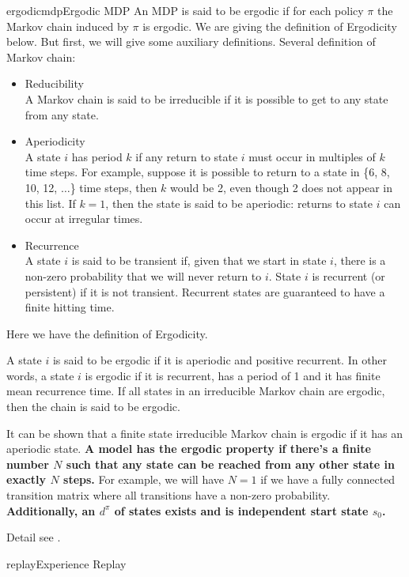 \documentclass[9pt]{article}
\begin{document}
\begin{topic}{ergodicmdp}{Ergodic MDP}
An MDP is said to be ergodic if for each policy $\pi$ the Markov chain induced by $\pi$ is ergodic.
We are giving the definition of Ergodicity below. But first, we will give some auxiliary definitions.
Several definition of Markov chain:
\begin{itemize}
\item Reducibility\\
A Markov chain is said to be irreducible if it is possible to get to any state from any state.
\item Aperiodicity\\
A state $i$ has period $k$ if any return to state $i$ must occur in multiples of $k$ time steps. For example, suppose it is possible to return to a state in \{6, 8, 10, 12, $\ldots$\} time steps, then $k$ would be 2, even though 2 does not appear in this list. If $k = 1$, then the state is said to be aperiodic: returns to state $i$ can occur at irregular times.
\item Recurrence\\
A state $i$ is said to be transient if, given that we start in state $i$, there is a non-zero probability that we will never return to $i$. State $i$ is recurrent (or persistent) if it is not transient. Recurrent states are guaranteed to have a finite hitting time.
\end{itemize}
Here we have the definition of Ergodicity.

A state $i$ is said to be ergodic if it is aperiodic and positive recurrent. In other words, a state $i$ is ergodic if it is recurrent, has a period of 1 and it has finite mean recurrence time. If all states in an irreducible Markov chain are ergodic, then the chain is said to be ergodic.

It can be shown that a finite state irreducible Markov chain is ergodic if it has an aperiodic state. {\bf A model has the ergodic property if there's a finite number $N$ such that any state can be reached from any other state in exactly $N$ steps.} For example, we will have $N=1$ if we have a fully connected transition matrix where all transitions have a non-zero probability.
{\bf Additionally, an  $d^{\pi}$ of states exists and is independent start state $s_0$.}

Detail see \citep{ortner2007linear}.
\end{topic}

\begin{topic}{replay}{Experience Replay}
\citep{Vanseijen2015Deeper} \citep{Riedmiller2005Neural}
\end{topic}
\end{document}
